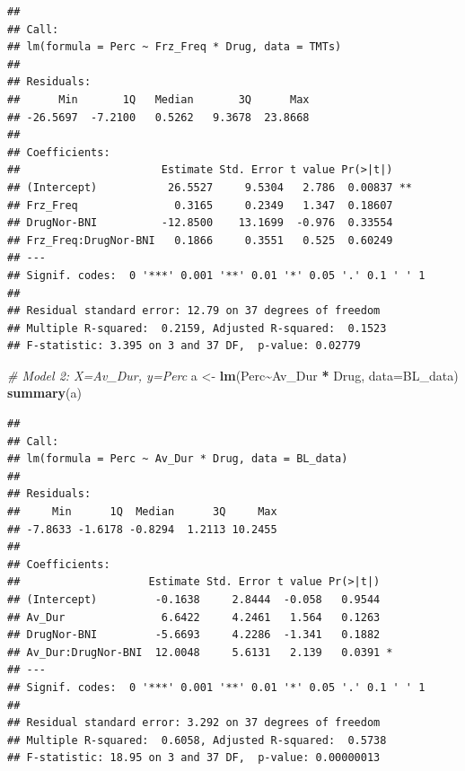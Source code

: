 \documentclass[
]{book}
\newenvironment{Shaded}{\begin{snugshade}}{\end{snugshade}}
\newcommand{\AttributeTok}[1]{\textcolor[rgb]{0.13,0.29,0.53}{#1}}
\newcommand{\CommentTok}[1]{\textcolor[rgb]{0.56,0.35,0.01}{\textit{#1}}}
\newcommand{\FunctionTok}[1]{\textcolor[rgb]{0.13,0.29,0.53}{\textbf{#1}}}
\newcommand{\NormalTok}[1]{#1}
\newcommand{\OtherTok}[1]{\textcolor[rgb]{0.56,0.35,0.01}{#1}}
\newcommand{\SpecialCharTok}[1]{\textcolor[rgb]{0.81,0.36,0.00}{\textbf{#1}}}
\begin{document}
\begin{verbatim}
## 
## Call:
## lm(formula = Perc ~ Frz_Freq * Drug, data = TMTs)
## 
## Residuals:
##      Min       1Q   Median       3Q      Max 
## -26.5697  -7.2100   0.5262   9.3678  23.8668 
## 
## Coefficients:
##                      Estimate Std. Error t value Pr(>|t|)   
## (Intercept)           26.5527     9.5304   2.786  0.00837 **
## Frz_Freq               0.3165     0.2349   1.347  0.18607   
## DrugNor-BNI          -12.8500    13.1699  -0.976  0.33554   
## Frz_Freq:DrugNor-BNI   0.1866     0.3551   0.525  0.60249   
## ---
## Signif. codes:  0 '***' 0.001 '**' 0.01 '*' 0.05 '.' 0.1 ' ' 1
## 
## Residual standard error: 12.79 on 37 degrees of freedom
## Multiple R-squared:  0.2159, Adjusted R-squared:  0.1523 
## F-statistic: 3.395 on 3 and 37 DF,  p-value: 0.02779
\end{verbatim}

\begin{Shaded}
\begin{Highlighting}[]
\CommentTok{\# Model 2: X=Av\_Dur, y=Perc}
\NormalTok{a }\OtherTok{\textless{}{-}} \FunctionTok{lm}\NormalTok{(Perc}\SpecialCharTok{\textasciitilde{}}\NormalTok{Av\_Dur }\SpecialCharTok{*}\NormalTok{ Drug, }\AttributeTok{data=}\NormalTok{BL\_data)}
\FunctionTok{summary}\NormalTok{(a)}
\end{Highlighting}
\end{Shaded}

\begin{verbatim}
## 
## Call:
## lm(formula = Perc ~ Av_Dur * Drug, data = BL_data)
## 
## Residuals:
##     Min      1Q  Median      3Q     Max 
## -7.8633 -1.6178 -0.8294  1.2113 10.2455 
## 
## Coefficients:
##                    Estimate Std. Error t value Pr(>|t|)  
## (Intercept)         -0.1638     2.8444  -0.058   0.9544  
## Av_Dur               6.6422     4.2461   1.564   0.1263  
## DrugNor-BNI         -5.6693     4.2286  -1.341   0.1882  
## Av_Dur:DrugNor-BNI  12.0048     5.6131   2.139   0.0391 *
## ---
## Signif. codes:  0 '***' 0.001 '**' 0.01 '*' 0.05 '.' 0.1 ' ' 1
## 
## Residual standard error: 3.292 on 37 degrees of freedom
## Multiple R-squared:  0.6058, Adjusted R-squared:  0.5738 
## F-statistic: 18.95 on 3 and 37 DF,  p-value: 0.00000013
\end{verbatim}
\end{document}
